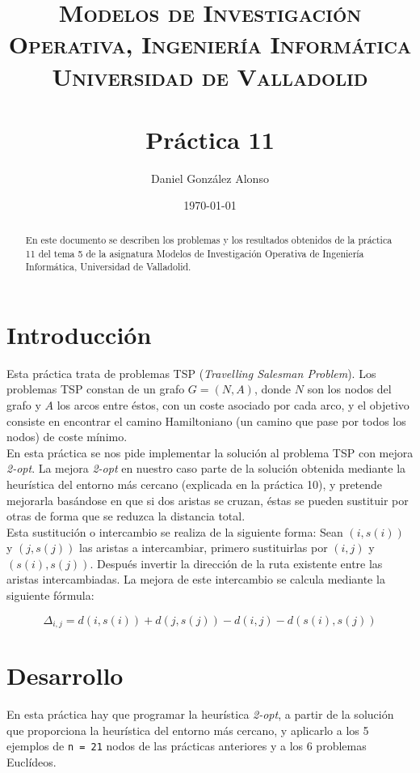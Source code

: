 \documentclass[a4paper,11pt]{article}
\title{
	\vspace{-25pt}
	\normalfont \Large \textsc{
		Modelos de Investigación Operativa,
        Ingeniería Informática\\
        Universidad de Valladolid
	}\\[10pt]
	\horrule{1pt}\\[10pt]
	\huge \textbf{
		Práctica 11
	}\\
	\horrule{1pt}
}
\author{
	\normalfont \Large Daniel González Alonso
}
\date{
	\normalfont \large \today
}
\begin{document}
\maketitle

\begin{abstract}
	En este documento se describen los problemas y los resultados obtenidos de la práctica 11 del tema 5 de la asignatura Modelos de Investigación Operativa de Ingeniería Informática, Universidad de Valladolid.
\end{abstract}

\section{Introducción}
Esta práctica trata de problemas TSP (\textit{Travelling Salesman Problem}). Los problemas TSP constan de un grafo ${G=(N,A)}$, donde ${N}$ son los nodos del grafo y ${A}$ los arcos entre éstos, con un coste asociado por cada arco, y el objetivo consiste en encontrar el camino Hamiltoniano (un camino que pase por todos los nodos) de coste mínimo.\\

En esta práctica se nos pide implementar la solución al problema TSP con mejora \textit{2-opt}. La mejora \textit{2-opt} en nuestro caso parte de la solución obtenida mediante la heurística del entorno más cercano (explicada en la práctica 10), y pretende mejorarla basándose en que si dos aristas se cruzan, éstas se pueden sustituir por otras de forma que se reduzca la distancia total.\\

Esta sustitución o intercambio se realiza de la siguiente forma: Sean ${\left( i,s\left(i\right) \right)}$ y ${\left( j,s\left(j\right) \right)}$ las aristas a intercambiar, primero sustituirlas por ${\left(i,j\right)}$ y ${\left( s\left(i\right),s\left(j\right) \right)}$. Después invertir la dirección de la ruta existente entre las aristas intercambiadas. La mejora de este intercambio se calcula mediante la siguiente fórmula:

\begin{equation}
\Delta_{i,j} = d\left(i,s(i)\right) + d\left(j,s(j)\right) - d(i,j) - d\left(s(i),s(j)\right)
\end{equation}

\newpage
\section{Desarrollo}
En esta práctica hay que programar la heurística \textit{2-opt}, a partir de la solución que proporciona la heurística del entorno más cercano, y aplicarlo a los 5 ejemplos de \texttt{n = 21} nodos de las prácticas anteriores y a los 6 problemas Euclídeos.\\\\
\end{document}
